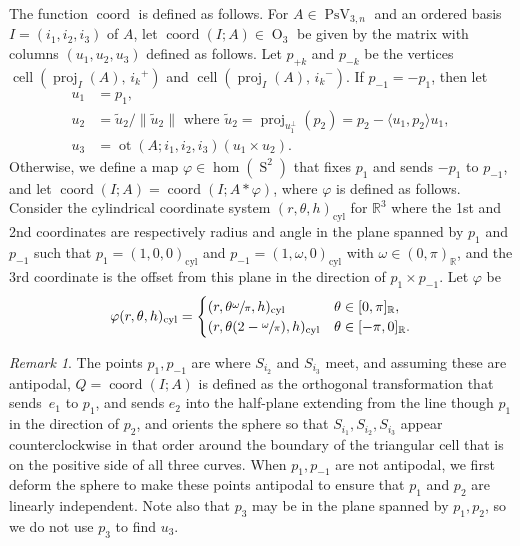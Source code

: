 \documentclass[JEP,XML,SOM,Unicode,NoFloatCountersInSection,published]{cedram}
\theoremstyle{remark}
\newtheorem{remark}[theorem]{Remark}
\let\mb\mathbb
\let\phi\varphi
\DeclareMathOperator{\orth}{O}
\DeclareMathOperator{\pstief}{PsV}
\DeclareMathOperator{\sphere}{S}
\DeclareMathOperator{\cell}{cell}
\DeclareMathOperator{\proj}{proj}
\DeclareMathOperator{\coord}{coord}
\DeclareMathOperator{\ot}{ot}
\begin{document}
The function $\coord$ is defined as follows.
For $A\in \pstief_{3,n}$ and an ordered basis $I = (i_1,i_2,i_3)$ of $A$,
let $\coord(I;A)\in \orth_3$ be given by the matrix with columns $(u_1,u_2,u_3)$ defined as follows.
Let $p_{+k}$ and $p_{-k}$ be the vertices $\cell(\proj_I(A),\, {i_k}^+)$ and $\cell(\proj_I(A),\, {i_k}^-)$.
If $p_{- 1} = -p_{1}$, then let
\begin{align*}
u_1 &= p_1, \\
u_2 &= \tilde u_2/ \|\tilde u_2\| \text{ where } \tilde u_2 = \proj_{u_1^{\perp}}(p_2) = {p_2 -\langle u_1, p_2 \rangle u_1}, \\
u_3 &= \ot(A;i_1,i_2,i_3) ( u_1 \times u_2).
\end{align*}
Otherwise, we define a map $\varphi \in \hom(\sphere^2)$ that fixes $p_1$ and sends $-p_{1}$ to $p_{-1}$, and let $\coord(I;A) = \coord(I;A * \varphi)$, where $\phi$ is defined as follows.
Consider the cylindrical coordinate system $(r,\theta,h)_\mathrm{cyl}$ for $\mb{R}^3$ where the 1st and 2nd coordinates are respectively radius and angle in the plane spanned by $p_1$ and $p_{-1}$ such that $p_1 =(1,0,0)_\mathrm{cyl}$ and $p_{-1} = (1,\omega,0)_\mathrm{cyl}$ with $\omega \in (0,\pi)_\mb{R}$, and the 3rd coordinate is the offset from this plane in the direction of $p_1 \times p_{-1}$. Let $\varphi$ be
\[ \varphi(r,\theta,h)_\mathrm{cyl} = \begin{cases} (r,\theta \sfrac{\omega}{\pi},h)_\mathrm{cyl} & \theta \in [0,\pi]_\mb{R}, \\ (r,\theta (2-\sfrac{\omega}{\pi}),h)_\mathrm{cyl} & \theta \in [-\pi,0]_\mb{R}. \end{cases} \]

\begin{remark}
The points $p_{1},p_{-1}$ are where $S_{i_2}$ and $S_{i_3}$ meet, and assuming these are antipodal, $Q = \coord(I;A)$ is defined as the orthogonal transformation that sends~$e_{1}$ to $p_1$, and sends $e_2$ into the half-plane extending from the line though $p_1$ in the direction of $p_2$, and orients the sphere so that $S_{i_1},S_{i_2},S_{i_3}$ appear counterclockwise in that order around the boundary of the triangular cell that is on the positive side of all three curves.
When $p_{1},p_{-1}$ are not antipodal, we first deform the sphere to make these points antipodal to ensure that $p_1$ and $p_2$ are linearly independent.
Note also that $p_3$ may be in the plane spanned by $p_1,p_2$, so we do not use $p_3$ to find $u_3$.
\end{remark}
\end{document}
